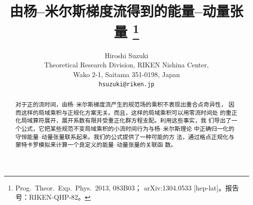 \documentclass[11pt]{ctexart}
\numberwithin{equation}{section}
\begin{document}
\title{由杨--米尔斯梯度流得到的能量--动量张量%
\thanks{Prog.\ Theor.\ Exp.\ Phys.\ 2013, 083B03；
arXiv:1304.0533 [hep-lat]。报告号：RIKEN-QHP-82。}}

\author{Hiroshi Suzuki\\[4pt]
Theoretical Research Division, RIKEN Nishina Center,\\
Wako 2-1, Saitama 351-0198, Japan\\
\texttt{hsuzuki@riken.jp}}
\date{}

\maketitle

\begin{abstract}
对于正的流时间，由杨--米尔斯梯度流产生的规范场的乘积不表现出重合点奇异性，
因而这样的局域乘积与正规化方案无关。而且，这样的局域乘积可以用零流时间处
的重正化局域算符展开，展开系数有限并受重正化群方程支配。利用这些事实，我
们导出了一个公式，它把某些规范不变局域乘积的小流时间行为与杨--米尔斯理论
中正确归一化的守恒能量--动量张量联系起来。我们的公式提供了一种可能的方
法，通过格点正规化与蒙特卡罗模拟来计算一个良定义的能量--动量张量的关联函
数。
\end{abstract}








\end{document}
